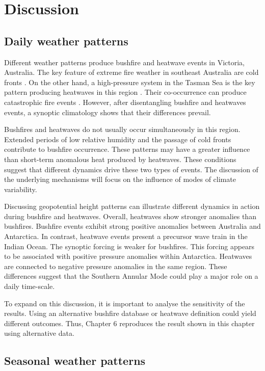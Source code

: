 \section{Discussion}


\subsection{Daily weather patterns}

Different weather patterns produce bushfire and heatwave events in
Victoria, Australia. The key feature of extreme fire weather in southeast
Australia are cold fronts \citep{Reeder1987,Reeder2015}. On the other
hand, a high-pressure system in the Tasman Sea is the key pattern
producing heatwaves in this region \citep{Pezza2012,Parker2014a}.
Their co-occurrence can produce catastrophic fire events \citep{Mills2005,Engel2013}.
However, after disentangling bushfire and heatwaves events, a synoptic
climatology shows that their differences prevail. 

Bushfires and heatwaves do not usually occur simultaneously in this
region. Extended periods of low relative humidity and the passage of cold fronts
contribute to bushfire occurrence. These patterns may have a greater
influence than short-term anomalous heat produced by heatwaves. These
conditions suggest that different dynamics drive these two types of
events. The discussion of the underlying mechanisms will focus on
the influence of modes of climate variability. 

Discussing geopotential height patterns can illustrate different dynamics
in action during bushfire and heatwaves. Overall, heatwaves show stronger
anomalies than bushfires. Bushfire events exhibit strong positive
anomalies between Australia and Antarctica. In contrast, heatwave
events present a precursor wave train in the Indian Ocean. The synoptic
forcing is weaker for bushfires. This forcing appears to be associated
with positive pressure anomalies within Antarctica. Heatwaves are
connected to negative pressure anomalies in the same region. These
differences suggest that the Southern Annular Mode could play a major
role on a daily time-scale.

To expand on this discussion, it is important to analyse the sensitivity
of the results. Using an alternative bushfire database or heatwave
definition could yield different outcomes. Thus, Chapter 6 reproduces
the result shown in this chapter using alternative data.


\subsection{Seasonal weather patterns }

